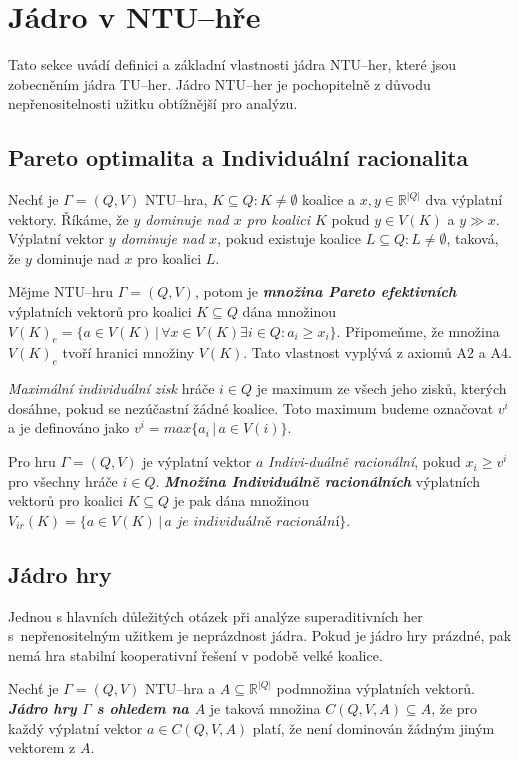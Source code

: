 \section{Jádro v NTU--hře}
    \label{sec:Core}
    Tato sekce uvádí definici a základní vlastnosti jádra NTU--her, které jsou zobecněním jádra TU--her. Jádro NTU--her je pochopitelně z důvodu nepřenositelnosti užitku obtížnější pro analýzu.

    \subsection{Pareto optimalita a Individuální racionalita}
        Nechť je $\Gamma = (Q, V)$ NTU--hra, $K \subseteq Q: K \neq \emptyset$ koalice a $x, y \in \mathbb{R}^{|Q|}$ dva výplatní vektory. Říkáme, že \textit{$y$ dominuje nad $x$ pro koalici $K$} pokud $y \in V(K)$ a $y \gg x$. Výplatní vektor \textit{$y$ dominuje nad $x$}, pokud existuje koalice $L \subseteq Q: L \neq \emptyset$, taková, že $y$ dominuje nad $x$ pro koalici $L$.

        Mějme NTU--hru $\Gamma = (Q, V)$, potom je \textit{\textbf{množina Pareto efektivních}} výplatních vektorů pro koalici $K \subseteq Q$ dána množinou $V(K)_e = \{a \in V(K)\,|\,\forall x \in V(K) \exists i \in Q: a_i \geq x_i\}$. Připomeňme, že množina $V(K)_e$ tvoří hranici množiny $V(K)$. Tato vlastnost vyplývá z axiomů A2 a A4.

        \textit{Maximální individuální zisk} hráče $i \in Q$ je maximum ze všech jeho zisků, kterých dosáhne, pokud se nezúčastní žádné koalice. Toto maximum budeme označovat $v^i$ a je definováno jako $v^i = max\{a_i\,|\, a \in V({i})\}$.

        Pro hru $\Gamma = (Q, V)$ je výplatní vektor $a$ \textit{Indivi-duálně racionální}, pokud $x_i \geq v^i$ pro všechny hráče $i \in Q$. \textit{\textbf{Množina Individuálně racionálních}} výplatních vektorů pro koalici $K \subseteq Q$ je pak dána množinou $V_{ir}(K) = \{a \in V(K)\,|\, a \textit{ je individuálně racionální}\}$.

    \subsection{Jádro hry}
        Jednou s hlavních důležitých otázek při analýze superaditivních her s~nepřenositelným užitkem je neprázdnost jádra. Pokud je jádro hry prázdné, pak nemá hra stabilní kooperativní řešení v podobě velké koalice.

        Nechť je $\Gamma = (Q, V)$ NTU--hra a $A \subseteq \mathbb{R}^{|Q|}$ podmnožina výplatních vektorů. \textit{\textbf{Jádro hry $\Gamma$ s ohledem na $A$}} je taková množina $C(Q, V, A) \subseteq A$, že pro každý výplatní vektor $a \in C(Q, V, A)$ platí, že není dominován žádným jiným vektorem z $A$.

